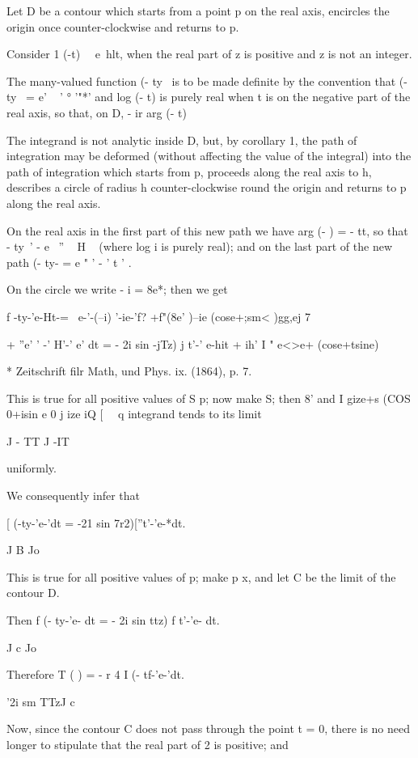Let D be a contour which starts from a point p on the real axis,
encircles the origin once counter-clockwise and returns to p.

Consider 1 (-t)~~ e~hlt, when the real part of z is positive and z is
not an integer.

The many-valued function (- ty~ is to be made definite by the
convention that (- ty~ = e' ~ ' ° '"*' and log (- t) is purely real
when t is on the negative part of the real axis, so that, on D, - ir %
arg (- t) %

The integrand is not analytic inside D, but, by  corollary 1, the
path of integration may be deformed (without affecting the value of
the integral) into the path of integration which starts from p,
proceeds along the real axis to h, describes a circle of radius h
counter-clockwise round the origin and returns to p along the real
axis.

On the real axis in the first part of this new path we have arg (- ) =
- tt, so that - ty~' - e~ '' ~ H ~ (where log i is purely real); and
on the last part of the new path (- ty- = e " ' - ' t ' .

On the circle we write - i = 8e*; then we get

f -ty-'e-Ht-= \ e-'-(--i) '-ie-'f? +f"(8e' )--ie (cose+;sm< )gg,ej 7

+ ''e' ' -' H'-' e' dt = - 2i sin -jTz) j t'-' e-hit + ih' I " e<>e+
(cose+tsine) \

* Zeitschrift filr Math, und Phys. ix. (1864), p. 7.

%
%

This is true for all positive values of S p; now make S; then 8' and
I gize+s (COS 0+isin e 0 j ize iQ [ \ \ q integrand tends to its limit

J - TT J -IT

uniformly.

We consequently infer that

[ (-ty-'e-'dt = -21 sin 7r2)[''t'-'e-*dt.

J B Jo

This is true for all positive values of p; make p x, and let C be
the limit of the contour D.

Then f (- ty-'e- dt = - 2i sin ttz) f t'-'e- dt.

J c Jo

Therefore T ( ) = - r 4 I (- tf-'e-'dt.

'2i sm TTzJ c

Now, since the contour C does not pass through the point t = 0, there
is no need longer to stipulate that the real part of 2 is positive;
and


